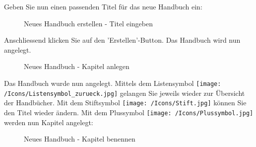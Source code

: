 Geben Sie nun einen passenden Titel für das neue Handbuch ein: 

\begin{figure}[H]
\caption{Neues Handbuch erstellen - Titel eingeben}
\end{figure}

Anschliessend klicken Sie auf den 'Erstellen'-Button. Das Handbuch wird nun angelegt.

\begin{figure}[H]
\caption{Neues Handbuch - Kapitel anlegen}
\end{figure}

Das Handbuch wurde nun angelegt. Mittels dem Listensymbol \texttt{[image: /Icons/Listensymbol\_zurueck.jpg]}  gelangen Sie jeweils wieder zur Übersicht der Handbücher. Mit dem Stiftsymbol \texttt{[image: /Icons/Stift.jpg]}  können Sie den Titel wieder ändern. Mit dem Plussymbol \texttt{[image: /Icons/Plussymbol.jpg]}  werden nun Kapitel angelegt:

\begin{figure}[H]
\caption{Neues Handbuch - Kapitel benennen}
\end{figure}

